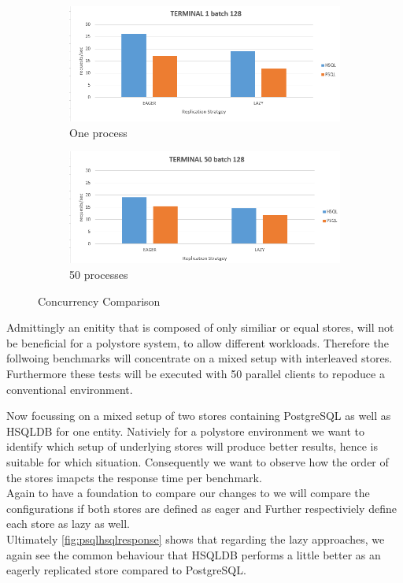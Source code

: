 \begin{figure}[t]
    \centering
    \begin{subfigure}{.5\textwidth}
      \centering
      \includegraphics[width=.9\linewidth]{Figures/terminal1.PNG}
      \caption{One process}
      \label{fig:terminal1}
    \end{subfigure}%
    \begin{subfigure}{.5\textwidth}
      \centering
      \includegraphics[width=.9\linewidth]{Figures/terminal50.PNG}
      \caption{50 processes}
      \label{fig:terminal50}
    \end{subfigure}
    \caption{Concurrency Comparison}
    \label{fig:terminal}
\end{figure}


Admittingly an enitity that is composed of only similiar or equal stores, will not be beneficial for a polystore system, to allow different workloads.
Therefore the follwoing benchmarks will concentrate on a mixed setup with interleaved stores. Furthermore these tests will be executed with 50 parallel clients to repoduce a 
conventional environment. 



Now focussing on a mixed setup of two stores containing PostgreSQL as well as HSQLDB for one entity.
Nativiely for a polystore environment we want to identify which setup of underlying stores will produce better results, hence is suitable for which situation.
Consequently we want to observe how the order of the stores imapcts the response time per benchmark.\\
Again to have a foundation to compare our changes to we will compare the configurations if both stores are defined as eager and Further
respectiviely define each store as lazy as well.\\
Ultimately \ref{fig:psqlhsqlresponse} shows that regarding the lazy approaches, we again see the common behaviour that HSQLDB performs a little better as an eagerly replicated
store compared to PostgreSQL.

